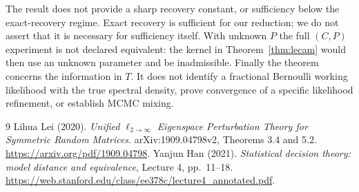 \documentclass[11pt]{article}
\begin{document}
The result does not provide a sharp recovery constant, or sufficiency below
the exact-recovery regime. Exact recovery is sufficient for our reduction;
we do not assert that it is necessary for sufficiency itself. With unknown
$P$ the full $(C,P)$ experiment is not declared equivalent: the kernel in
Theorem~\ref{thm:lecam} would then use an unknown parameter and be inadmissible.
Finally the theorem concerns the information in $T$. It does not identify
a fractional Bernoulli working likelihood with the true spectral density,
prove convergence of a specific likelihood refinement, or establish MCMC
mixing.

\begin{thebibliography}{9}
 Lihua Lei (2020).
\emph{Unified $\ell_{2\to\infty}$ Eigenspace Perturbation Theory for Symmetric
Random Matrices}. arXiv:1909.04798v2, Theorems 3.4 and 5.2.
\url{https://arxiv.org/pdf/1909.04798}.
 Yanjun Han (2021).
\emph{Statistical decision theory: model distance and equivalence},
Lecture 4, pp.\ 11--18.
\url{https://web.stanford.edu/class/ee378c/lecture4_annotated.pdf}.
\end{thebibliography}
\end{document}
